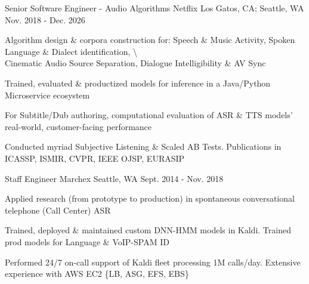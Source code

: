 

\begin{cventries}

  \cventry
    {Senior Software Engineer - Audio Algorithms} %
    {Netflix} %
    {Los Gatos, CA; Seattle, WA} %
    {Nov. 2018 - Dec. 2026} %
    {
      \begin{cvitems} %
        \item {Algorithm design \& corpora construction for: Speech \& Music Activity, Spoken Language \& Dialect identification, \textbackslash \\ Cinematic Audio Source Separation, Dialogue Intelligibility \& AV Sync}
        \item {Trained, evaluated \& productized models for inference in a Java/Python Microservice ecosystem}
        \item {For Subtitle/Dub authoring, computational evaluation of ASR \& TTS models' real-world, customer-facing performance}
        \item {Conducted myriad Subjective Listening \& Scaled AB Tests. Publications in ICASSP, ISMIR, CVPR, IEEE OJSP, EURASIP}
      \end{cvitems}
    }


  \cventry
    {Staff Engineer} %
    {Marchex} %
    {Seattle, WA} %
    {Sept. 2014 - Nov. 2018} %
    {
      \begin{cvitems} %
        \item {Applied research (from prototype to production) in spontaneous conversational telephone (Call Center) ASR}
        \item {Trained, deployed \& maintained custom DNN-HMM models in Kaldi. Trained prod models for Language \& VoIP-SPAM ID}
        \item {Performed 24/7 on-call support of Kaldi fleet processing 1M calls/day. Extensive experience with AWS EC2 \{LB, ASG, EFS, EBS\}}
      \end{cvitems}
    }


\end{cventries}
